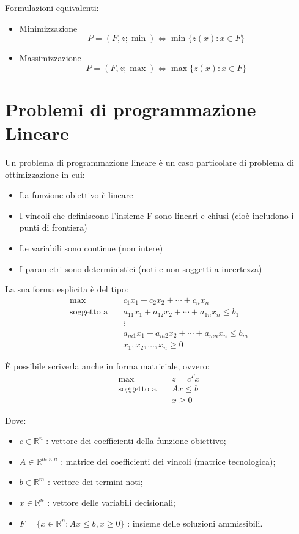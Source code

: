 Formulazioni equivalenti:

\begin{itemize}

    \item Minimizzazione
    \[
    P = (F, z; \min) \Leftrightarrow \min\{z(x) : x \in F\}
    \]
    \item Massimizzazione
    \[
    P = (F, z; \max) \Leftrightarrow \max\{z(x) : x \in F\}
    \]
\end{itemize}

\section{Problemi di programmazione Lineare}
Un problema di programmazione lineare è un caso particolare di problema di ottimizzazione in cui:

\begin{itemize}
    \item La funzione obiettivo è lineare
    \item I vincoli che definiscono l'insieme F sono lineari e chiusi (cioè includono i punti di frontiera)
    \item Le variabili sono continue (non intere)
    \item I parametri sono deterministici (noti e non soggetti a incertezza)
\end{itemize}

La sua forma esplicita è del tipo:
\begin{align}
\max & \quad c_1x_1 + c_2x_2 + \cdots + c_nx_n \\
\text{soggetto a} & \quad a_{11}x_1 + a_{12}x_2 + \cdots + a_{1n}x_n \leq b_1 \\
& \quad \vdots \\
& \quad a_{m1}x_1 + a_{m2}x_2 + \cdots + a_{mn}x_n \leq b_m \\
& \quad x_1, x_2, \ldots, x_n \geq 0
\end{align}

È possibile scriverla anche in forma matriciale, ovvero:
\begin{align}
\max & \quad z = c^T x \\
\text{soggetto a} & \quad Ax \leq b \\
& \quad x \geq 0
\end{align}

Dove:


\begin{itemize}
    \item $c \in \mathbb{R}^n$ : vettore dei coefficienti della funzione obiettivo;
    \item $A \in \mathbb{R}^{m \times n}$ : matrice dei coefficienti dei vincoli (matrice tecnologica);
    \item $b \in \mathbb{R}^m$ : vettore dei termini noti;
    \item $x \in \mathbb{R}^n$ : vettore delle variabili decisionali;
    \item $F = \{x \in \mathbb{R}^n : Ax \leq b, x \geq 0\}$ : insieme delle soluzioni ammissibili.
\end{itemize}


